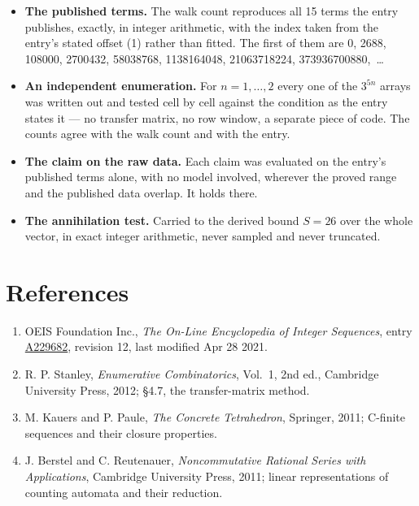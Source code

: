 \documentclass[11pt]{article}
\theoremstyle{definition}
\begin{document}
\begin{itemize}

\item {\bfseries The published terms.} The walk count reproduces all 15 terms the entry publishes, exactly, in integer arithmetic, with the index taken from the entry's stated offset (1) rather than fitted. The first of them are 0, 2688, 108000, 2700432, 58038768, 1138164048, 21063718224, 373936700880,~\dots

\item {\bfseries An independent enumeration.} For $n = 1,\dots,2$ every one of the $3^{5n}$ arrays was written out and tested cell by cell against the condition as the entry states it --- no transfer matrix, no row window, a separate piece of code. The counts agree with the walk count and with the entry.

\item {\bfseries The claim on the raw data.} Each claim was evaluated on the entry's published terms alone, with no model involved, wherever the proved range and the published data overlap. It holds there.

\item {\bfseries The annihilation test.} Carried to the derived bound $S = 26$ over the whole vector, in exact integer arithmetic, never sampled and never truncated.

\end{itemize}

\section{References}

\begin{enumerate}

\item OEIS Foundation Inc., \emph{The On-Line Encyclopedia of Integer Sequences}, entry \href{https://oeis.org/A229682}{A229682}, revision 12, last modified Apr 28 2021.

\item R. P. Stanley, \emph{Enumerative Combinatorics}, Vol.~1, 2nd ed., Cambridge University Press, 2012; \S4.7, the transfer-matrix method.

\item M. Kauers and P. Paule, \emph{The Concrete Tetrahedron}, Springer, 2011; C-finite sequences and their closure properties.

\item J. Berstel and C. Reutenauer, \emph{Noncommutative Rational Series with Applications}, Cambridge University Press, 2011; linear representations of counting automata and their reduction.

\end{enumerate}
\end{document}
